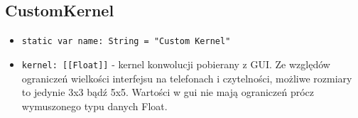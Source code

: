 \documentclass[a4paper]{article}
\begin{document}
\subsection{CustomKernel}

\begin{itemize}
    \item \texttt{static var name: String = "Custom Kernel"}
    \item \texttt{kernel: [[Float]]} - kernel konwolucji pobierany z GUI. Ze względów ograniczeń wielkości interfejsu na telefonach i czytelności, możliwe rozmiary to jedynie 3x3 bądź 5x5. Wartości w gui nie mają ograniczeń prócz wymuszonego typu danych Float.
\end{itemize}

\begin{figure}[H]
    \centering
    \begin{subfigure}{0.2\textwidth}
        \centering

\end{subfigure}
\end{figure}
\end{document}
